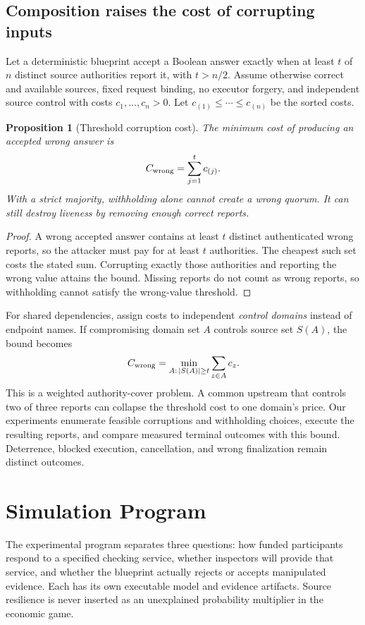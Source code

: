\documentclass[10pt]{article}
\newtheorem{proposition}{Proposition}
\begin{document}
\subsection{Composition raises the cost of corrupting inputs}
\label{sec:composition}

Let a deterministic blueprint accept a Boolean answer exactly when at least $t$ of $n$ distinct source authorities report it, with $t>n/2$. Assume otherwise correct and available sources, fixed request binding, no executor forgery, and independent source control with costs $c_1,\ldots,c_n>0$. Let $c_{(1)}\leq\cdots\leq c_{(n)}$ be the sorted costs.

\begin{proposition}[Threshold corruption cost]
\label{prop:source_cost}
The minimum cost of producing an accepted wrong answer is
\[
C_{\rm wrong}=\sum_{j=1}^{t}c_{(j)}.
\]
With a strict majority, withholding alone cannot create a wrong quorum. It can still destroy liveness by removing enough correct reports.
\end{proposition}
\begin{proof}
A wrong accepted answer contains at least $t$ distinct authenticated wrong reports, so the attacker must pay for at least $t$ authorities. The cheapest such set costs the stated sum. Corrupting exactly those authorities and reporting the wrong value attains the bound. Missing reports do not count as wrong reports, so withholding cannot satisfy the wrong-value threshold.
\end{proof}

For shared dependencies, assign costs to independent \emph{control domains} instead of endpoint names. If compromising domain set $A$ controls source set $S(A)$, the bound becomes
\[
C_{\rm wrong}=\min_{A:\,|S(A)|\geq t}\sum_{z\in A}c_z.
\]
This is a weighted authority-cover problem. A common upstream that controls two of three reports can collapse the threshold cost to one domain's price. Our experiments enumerate feasible corruptions and withholding choices, execute the resulting reports, and compare measured terminal outcomes with this bound. Deterrence, blocked execution, cancellation, and wrong finalization remain distinct outcomes.

\section{Simulation Program}
\label{sec:simulation}

The experimental program separates three questions: how funded participants respond to a specified checking service, whether inspectors will provide that service, and whether the blueprint actually rejects or accepts manipulated evidence. Each has its own executable model and evidence artifacts. Source resilience is never inserted as an unexplained probability multiplier in the economic game.
\end{document}
